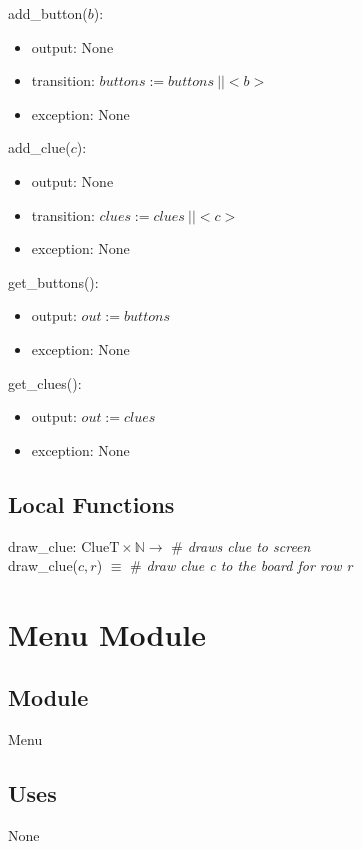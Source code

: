 \documentclass[12pt]{article}
\begin{document}
\noindent add\_button($b$):
\begin{itemize}
    \item output: None
    \item transition: $\mathit{buttons} := buttons \ || <b>$
    \item exception: None
\end{itemize}

\noindent add\_clue($c$):
\begin{itemize}
\item output: None
\item transition: $\mathit{clues} := clues\ || <c>$
\item exception: None
\end{itemize}

\noindent get\_buttons(): 
\begin{itemize} 
\item output: $\mathit{out} := buttons$
\item exception: None
\end{itemize}

\noindent get\_clues(): 
\begin{itemize} 
\item output: $\mathit{out} := clues$
\item exception: None
\end{itemize}

\subsection*{Local Functions}

\noindent draw\_clue: $\text{ClueT}\times \mathbb{N} \rightarrow $ \# \textit{draws clue to screen}\\
\noindent draw\_clue($c, r$) $\equiv$  \# \textit{ draw clue c to the board for row r}

\newpage

\section* {Menu Module}

\subsection*{Module}
Menu

\subsection* {Uses}
None
\end{document}

